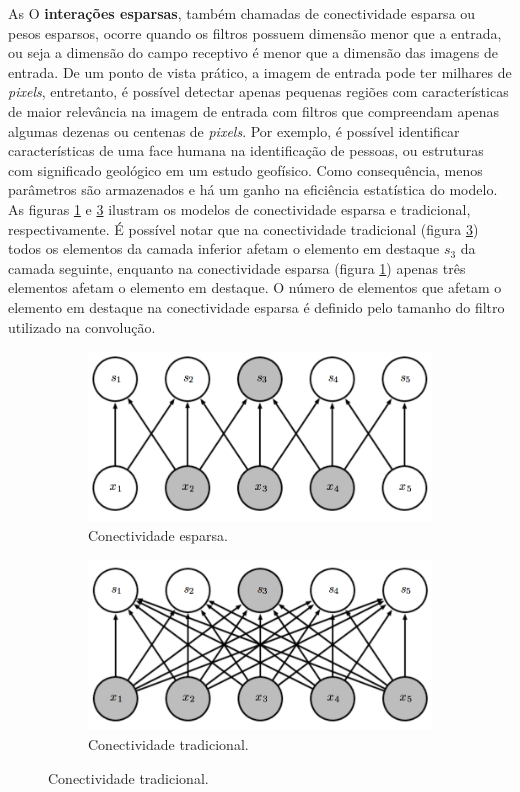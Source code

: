 As O \textbf{interações esparsas}, também chamadas de conectividade esparsa ou pesos esparsos,
ocorre quando os filtros possuem  dimensão menor que a entrada, ou seja a
dimensão do campo receptivo é menor que a dimensão das imagens de entrada.
De um ponto de vista prático, a imagem de entrada pode ter milhares de \textit{pixels}, entretanto, é 
possível detectar apenas pequenas regiões com características de maior relevância na imagem de entrada
com filtros que compreendam apenas algumas dezenas ou centenas de \textit{pixels}.
Por exemplo, é possível identificar características de uma face humana na identificação de pessoas, ou estruturas com
significado geológico em um estudo geofísico. Como consequência,
menos parâmetros são armazenados e há um ganho na eficiência estatística do
modelo. As figuras \ref{fig:sparse} e \ref{fig:full} ilustram
os modelos de conectividade esparsa e tradicional, respectivamente.
É possível notar que na conectividade tradicional (figura \ref{fig:full}) todos os elementos da camada inferior
afetam o elemento em destaque $s_3$ da camada seguinte, enquanto na conectividade esparsa (figura \ref{fig:sparse}) apenas
três elementos afetam o elemento em destaque. O número de elementos que afetam o elemento em destaque na
conectividade esparsa é definido pelo tamanho do filtro utilizado na convolução.

\begin{figure}[htp]
\begin{subfigure}{.5\textwidth}
  \centering
  \includegraphics[width=.9\linewidth]{fig/sparse}
  \caption{Conectividade esparsa.}
  \label{fig:sparse}
\end{subfigure}
\begin{subfigure}{.5\textwidth}
  \centering
  \includegraphics[width=.9\linewidth]{fig/full}
  \caption{Conectividade tradicional.}
  \label{fig:full}
\end{subfigure}%
\end{figure}

